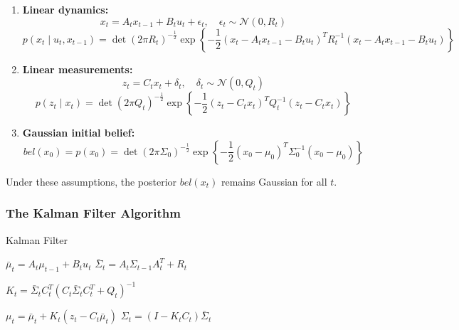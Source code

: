 \begin{enumerate}
\item \textbf{Linear dynamics:}
\begin{equation}
x_t = A_t x_{t-1} + B_t u_t + \epsilon_t, \quad \epsilon_t \sim \mathcal{N}(0, R_t)
\end{equation}
\begin{equation}
  p(x_t \mid u_t, x_{t-1}) = \det(2\pi R_t)^{-\frac{1}{2}} \exp \left\{-\frac{1}{2} (x_t - A_t x_{t-1} - B_t u_t)^T R_t^{-1} (x_t - A_t x_{t-1} - B_t u_t) \right\}
  \label{eq:posterior state}
\end{equation}
\item \textbf{Linear measurements:}
\begin{equation}
z_t = C_t x_t + \delta_t, \quad \delta_t \sim \mathcal{N}(0, Q_t)
\end{equation}
\begin{equation}
  p(z_t \mid x_{t}) = \det(2\pi Q_t)^{-\frac{1}{2}} \exp \left\{-\frac{1}{2} (z_t - C_t x_{t} )^T Q_t^{-1} (z_t - C_t x_{t}) \right\}
  \label{eq:measurement probability}
\end{equation}
\item \textbf{Gaussian initial belief:}
\begin{equation}
bel(x_0) = p(x_0) = \det(2\pi \Sigma_0)^{-\frac{1}{2}} \exp \left\{-\frac{1}{2} (x_0 - \mu_0)^T \Sigma_0^{-1} (x_0 - \mu_0) \right\}
\end{equation}

\end{enumerate}

Under these assumptions, the posterior $bel(x_t)$ remains Gaussian for all $t$.

\subsubsection{The Kalman Filter Algorithm}

\begin{algorithm}[H]
\caption{Kalman Filter}

\BlankLine
{}
$\bar{\mu}_t = A_t \mu_{t-1} + B_t u_t$\;
$\bar{\Sigma}_t = A_t \Sigma_{t-1} A_t^T + R_t$\;

\BlankLine
{}
$K_t = \bar{\Sigma}_t C_t^T (C_t \bar{\Sigma}_t C_t^T + Q_t)^{-1}$\;

\BlankLine
{}
$\mu_t = \bar{\mu}_t + K_t (z_t - C_t \bar{\mu}_t)$\;
$\Sigma_t = (I - K_tC_t)\bar{\Sigma}_t$\;

\BlankLine
{}
\end{algorithm}

